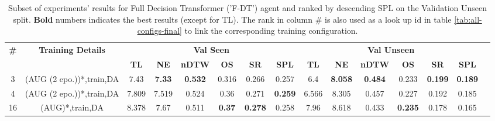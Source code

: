 \begin{table}
\centering
\caption{\label{tab:f_dt_dagger_envdrop}Subset of experiments' results for Full Decision Transformer ('F-DT') agent and ranked by descending SPL on the Validation Unseen split. \textbf{Bold} numbers indicates the best results (except for TL). The rank in column \# is also used as a look up id in table \ref{tab:all-configs-final} to link the corresponding training configuration.}
\begin{tabular}{@{\hskip3pt}c@{\hskip3pt}c@{\hskip3pt}c@{\hskip3pt}c@{\hskip3pt}c@{\hskip3pt}c@{\hskip3pt}c@{\hskip3pt}c@{\hskip3pt}c@{\hskip3pt}c@{\hskip3pt}c@{\hskip3pt}c@{\hskip3pt}c@{\hskip3pt}c@{\hskip3pt}c}
\toprule
                                  \textbf{\#} & \textbf{Training Details} & \multicolumn{6}{c}{\textbf{Val Seen}} & \multicolumn{6}{c}{\textbf{Val Unseen}} \\
\cmidrule(l){3-8}\cmidrule(l){9-14}\textbf{~} &                \textbf{~} &       \textbf{TL} &    \textbf{NE} &   \textbf{nDTW} &    \textbf{OS} &     \textbf{SR} &    \textbf{SPL} &         \textbf{TL} &     \textbf{NE} &   \textbf{nDTW} &     \textbf{OS} &     \textbf{SR} &    \textbf{SPL} \\
\midrule
                                            3 &  (AUG (2 epo.))*,train,DA &              7.43 &  \textbf{7.33} &  \textbf{0.532} &          0.316 &           0.266 &           0.257 &                 6.4 &  \textbf{8.058} &  \textbf{0.484} &           0.233 &  \textbf{0.199} &  \textbf{0.189} \\
                                            4 &  (AUG (2 epo.))*,train,DA &             7.809 &          7.519 &           0.524 &           0.36 &           0.271 &  \textbf{0.259} &               6.566 &           8.305 &           0.457 &           0.227 &           0.192 &           0.185 \\
                                           16 &           (AUG)*,train,DA &             8.378 &           7.67 &           0.511 &  \textbf{0.37} &  \textbf{0.278} &           0.258 &                7.96 &           8.618 &           0.433 &  \textbf{0.235} &           0.178 &           0.165 \\
\bottomrule
\end{tabular}
\end{table}
